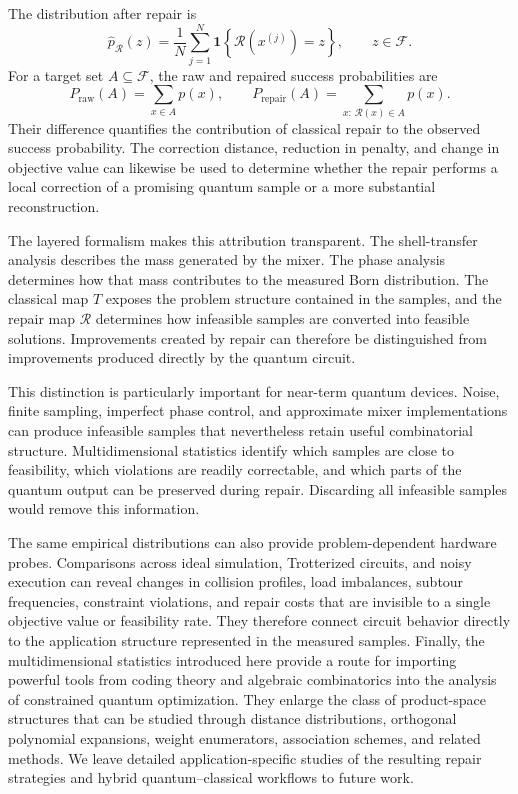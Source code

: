 \documentclass[a4paper,onecolumn,11pt,unpublished]{quantumarticle}
\theoremstyle{remark}
\begin{document}
The distribution after repair is
\[
\widehat p_{\mathcal R}(z)
=
\frac{1}{N}
\sum_{j=1}^{N}
\mathbf 1\!\left\{
\mathcal R\!\left(x^{(j)}\right)=z
\right\},
\qquad z\in\mathcal F.
\]
For a target set \(A\subseteq\mathcal F\), the raw and repaired success
probabilities are
\[
P_{\mathrm{raw}}(A)
=
\sum_{x\in A}p(x),
\qquad
P_{\mathrm{repair}}(A)
=
\sum_{x:\,\mathcal R(x)\in A}p(x).
\]
Their difference quantifies the contribution of classical repair to the
observed success probability. The correction distance, reduction in penalty,
and change in objective value can likewise be used to determine whether the
repair performs a local correction of a promising quantum sample or a more
substantial reconstruction.

The layered formalism makes this attribution transparent. The shell-transfer
analysis describes the mass generated by the mixer. The phase analysis
determines how that mass contributes to the measured Born distribution. The
classical map \(T\) exposes the problem structure contained in the samples,
and the repair map \(\mathcal R\) determines how infeasible samples are
converted into feasible solutions. Improvements created by repair can
therefore be distinguished from improvements produced directly by the
quantum circuit.

This distinction is particularly important for near-term quantum devices.
Noise, finite sampling, imperfect phase control, and approximate mixer
implementations can produce infeasible samples that nevertheless retain
useful combinatorial structure. Multidimensional statistics identify which
samples are close to feasibility, which violations are readily correctable,
and which parts of the quantum output can be preserved during repair.
Discarding all infeasible samples would remove this information.

The same empirical distributions can also provide problem-dependent hardware probes. Comparisons across ideal simulation, Trotterized circuits, and noisy execution can reveal changes in collision profiles, load imbalances, subtour
frequencies, constraint violations, and repair costs that are invisible to a single objective value or feasibility rate. They therefore connect circuit behavior directly to the application structure represented in the measured samples. Finally, the multidimensional statistics introduced here provide a route for importing powerful tools from coding theory and algebraic combinatorics into the analysis of constrained quantum optimization. They enlarge the class of product-space structures that can be studied through distance distributions, orthogonal polynomial expansions, weight enumerators, association schemes, and related methods. We leave detailed application-specific studies of the resulting repair strategies and hybrid quantum--classical workflows to future work.
\end{document}
